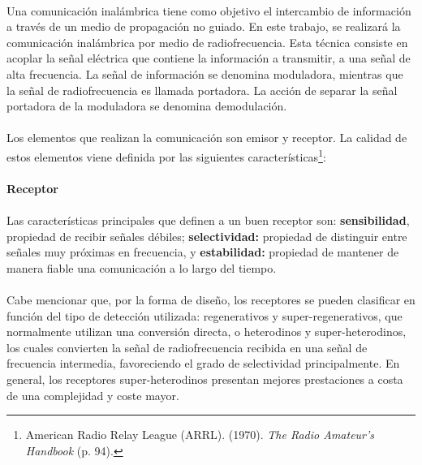 


\paragraph{}
Una comunicación inalámbrica tiene como objetivo el intercambio de información a través de un medio de propagación no guiado.
En este trabajo, se realizará la comunicación inalámbrica por medio de radiofrecuencia. Esta técnica consiste en acoplar la señal eléctrica que contiene la información a transmitir, a una señal de alta frecuencia. La señal de información se denomina moduladora, mientras que la señal de radiofrecuencia es llamada portadora. La acción de separar la señal portadora de la moduladora se denomina demodulación.
\paragraph{}
Los elementos que realizan la comunicación son emisor y receptor. La calidad de estos elementos viene definida por las siguientes características\footnote{American Radio Relay League (ARRL). (1970). \textit{The Radio Amateur's Handbook} (p. 94).}:
\paragraph{Receptor}
\paragraph{}
Las características principales que definen a un buen receptor son: \textbf{sensibilidad}, propiedad de recibir señales débiles; \textbf{selectividad:} propiedad de distinguir entre señales muy próximas en frecuencia, y \textbf{estabilidad:} propiedad de mantener de manera fiable una comunicación a lo largo del tiempo.
\paragraph{}
Cabe mencionar que, por la forma de diseño, los receptores se pueden clasificar en función del tipo de detección utilizada: regenerativos y super-regenerativos, que normalmente utilizan una conversión directa, 
o heterodinos y super-heterodinos, los cuales convierten la señal de radiofrecuencia recibida en una señal de frecuencia intermedia, favoreciendo el grado de selectividad principalmente. En general, los receptores super-heterodinos presentan mejores prestaciones a costa de una complejidad y coste mayor.

